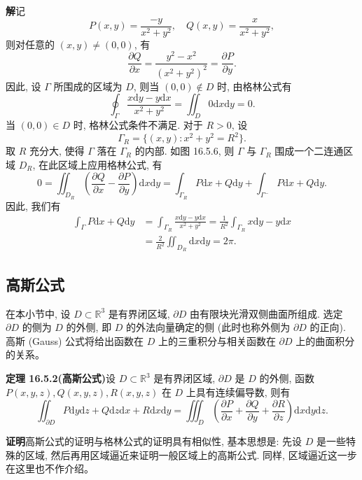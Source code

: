 \documentclass[UTF8,12pt,a4paper,fontset=fandol]{ctexart}
\begin{document}
\noindent\textbf{解}\quad 记
\[
  P(x,y)=\frac{-y}{x^2+y^2},\quad Q(x,y)=\frac{x}{x^2+y^2},
\]
则对任意的 $(x,y)\ne(0,0)$, 有
\[
  \frac{\partial Q}{\partial x}=\frac{y^2-x^2}{(x^2+y^2)^2}=\frac{\partial P}{\partial y}.
\]
因此, 设 $\Gamma$ 所围成的区域为 $D$, 则当 $(0,0)\notin D$ 时, 由格林公式有
\[
  \oint_\Gamma\frac{x\mathrm dy-y\mathrm dx}{x^2+y^2}
  =\iint_D0\mathrm dx\mathrm dy=0.
\]
当 $(0,0)\in D$ 时, 格林公式条件不满足. 对于 $R>0$, 设
\[
  \Gamma_R=\{(x,y):x^2+y^2=R^2\}.
\]
取 $R$ 充分大, 使得 $\Gamma$ 落在 $\Gamma_R$ 的内部. 如图 16.5.6, 则 $\Gamma$ 与 $\Gamma_R$ 围成一个二连通区域 $D_R$, 在此区域上应用格林公式, 有
\[
  0=\iint_{D_R}\left(\frac{\partial Q}{\partial x}-\frac{\partial P}{\partial y}\right)\mathrm dx\mathrm dy
  =\int_{\Gamma_R}P\mathrm dx+Q\mathrm dy+\int_{\Gamma^-}P\mathrm dx+Q\mathrm dy.
\]
因此, 我们有
\[
\begin{aligned}
  \int_\Gamma P\mathrm dx+Q\mathrm dy
  &=\int_{\Gamma_R}\frac{x\mathrm dy-y\mathrm dx}{x^2+y^2}
    =\frac1{R^2}\int_{\Gamma_R}x\mathrm dy-y\mathrm dx\\
  &=\frac2{R^2}\iint_{D_R}\mathrm dx\mathrm dy=2\pi.
\end{aligned}
\]

\subsection{高斯公式}

在本小节中, 设 $D\subset\mathbb R^3$ 是有界闭区域, $\partial D$ 由有限块光滑双侧曲面所组成. 选定 $\partial D$ 的侧为 $D$ 的外侧, 即 $D$ 的外法向量确定的侧 (此时也称外侧为 $\partial D$ 的正向). 高斯 (Gauss) 公式将给出函数在 $D$ 上的三重积分与相关函数在 $\partial D$ 上的曲面积分的关系。

\noindent\textbf{定理 16.5.2(高斯公式)}\quad 设 $D\subset\mathbb R^3$ 是有界闭区域, $\partial D$ 是 $D$ 的外侧, 函数\allowbreak $P(x,y,z),Q(x,y,z),R(x,y,z)$ 在 $D$ 上具有连续偏导数, 则有
\[
  \iint_{\partial D}P\mathrm dy\mathrm dz+Q\mathrm dz\mathrm dx+R\mathrm dx\mathrm dy
  =\iiint_D\left(\frac{\partial P}{\partial x}+\frac{\partial Q}{\partial y}
  +\frac{\partial R}{\partial z}\right)\mathrm dx\mathrm dy\mathrm dz.
\]

\noindent\textbf{证明}\quad 高斯公式的证明与格林公式的证明具有相似性, 基本思想是: 先设 $D$ 是一些特殊的区域, 然后再用区域逼近来证明一般区域上的高斯公式. 同样, 区域逼近这一步在这里也不作介绍。
\end{document}
